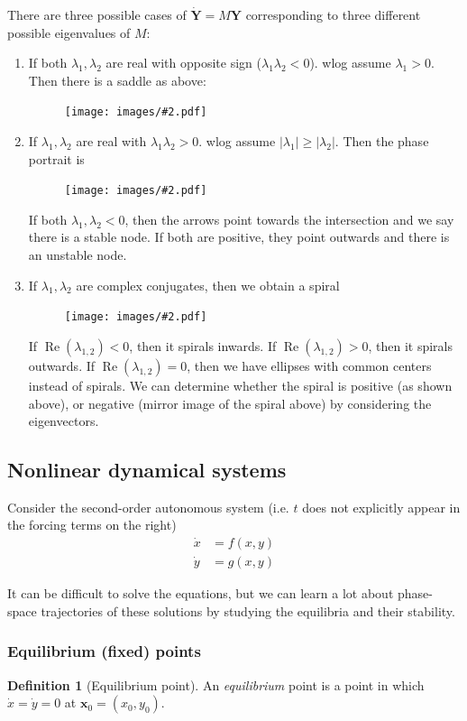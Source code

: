 \documentclass[a4paper]{article}
\theoremstyle{definition}
\newtheorem*{defi}{Definition}
\newcommand{\mb}[1]{\mathbf{#1}}
\newcommand{\img}[2][]{\begin{figure}[ht]\centering\texttt{[image: images/\#2.pdf]}\end{figure}}
\DeclareMathOperator\re{Re}
\begin{document}
There are three possible cases of $\mb{\dot{Y}} = M\mb{Y}$ corresponding to three different possible eigenvalues of $M$:
\begin{enumerate}
\item If both $\lambda_1, \lambda_2$ are real with opposite sign ($\lambda_1\lambda_2 < 0$). wlog assume $\lambda_1 > 0$. Then there is a saddle as above:

  \img{de_25}

\item If $\lambda_1, \lambda_2$ are real with $\lambda_1\lambda_2 > 0$. wlog assume $|\lambda_1| \geq |\lambda_2|$. Then the phase portrait is

  \img{de_26}

  If both $\lambda_1, \lambda_2 < 0$, then the arrows point towards the intersection and we say there is a stable node. If both are positive, they point outwards and there is an unstable node.
  \newpage %
\item If $\lambda_1, \lambda_2$ are complex conjugates, then we obtain a spiral

  \img{de_27}

  If $\re (\lambda_{1, 2}) < 0$, then it spirals inwards. If $\re (\lambda_{1, 2}) > 0$, then it spirals outwards. If $\re (\lambda_{1, 2}) = 0$, then we have ellipses with common centers instead of spirals. We can determine whether the spiral is positive (as shown above), or negative (mirror image of the spiral above) by considering the eigenvectors.
\end{enumerate}

\subsection{Nonlinear dynamical systems}
Consider the second-order autonomous system (i.e. $t$ does not explicitly appear in the forcing terms on the right)
\begin{align*}
  \dot x &= f(x, y)\\
  \dot y &= g(x, y)
\end{align*}

It can be difficult to solve the equations, but we can learn a lot about phase-space trajectories of these solutions by studying the equilibria and their stability.

\subsubsection{Equilibrium (fixed) points}
\begin{defi}[Equilibrium point]
  An \emph{equilibrium} point is a point in which $\dot x = \dot y = 0$ at $\mb{x}_0 = (x_0, y_0)$.
\end{defi}
\end{document}

